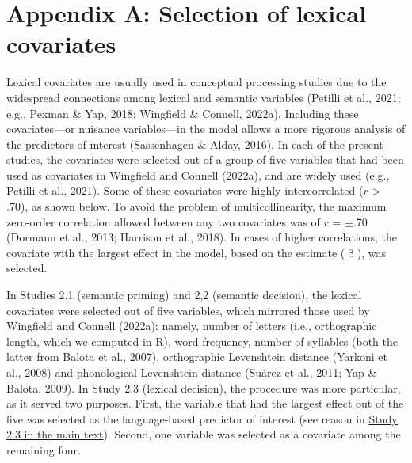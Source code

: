 \documentclass[
  12pt,
  man,floatsintext]{apa7}
\renewcommand\appendix{}
\begin{document}
\clearpage

\hypertarget{appendix-appendix}{%
\appendix}


\renewcommand{\thefigure}{A\arabic{figure}} \setcounter{figure}{0}
\renewcommand{\thetable}{A\arabic{table}} \setcounter{table}{0}

\hypertarget{appendix-A-lexical-covariates}{%
\section{Appendix A: Selection of lexical covariates}\label{appendix-A-lexical-covariates}}

Lexical covariates are usually used in conceptual processing studies due to the widespread connections among lexical and semantic variables (Petilli et al., 2021; e.g., Pexman \& Yap, 2018; Wingfield \& Connell, 2022a). Including these covariates---or nuisance variables---in the model allows a more rigorous analysis of the predictors of interest (Sassenhagen \& Alday, 2016). In each of the present studies, the covariates were selected out of a group of five variables that had been used as covariates in Wingfield and Connell (2022a), and are widely used (e.g., Petilli et al., 2021). Some of these covariates were highly intercorrelated (\(r\) \textgreater{} .70), as shown below. To avoid the problem of multicollinearity, the maximum zero-order correlation allowed between any two covariates was of \(r\) = \(\pm\).70 (Dormann et al., 2013; Harrison et al., 2018). In cases of higher correlations, the covariate with the largest effect in the model, based on the estimate (\(\upbeta\)), was selected.

In Studies 2.1 (semantic priming) and 2,2 (semantic decision), the lexical covariates were selected out of five variables, which mirrored those used by Wingfield and Connell (2022a): namely, number of letters (i.e., orthographic length, which we computed in R), word frequency, number of syllables (both the latter from Balota et al., 2007), orthographic Levenshtein distance (Yarkoni et al., 2008) and phonological Levenshtein distance (Suárez et al., 2011; Yap \& Balota, 2009). In Study 2.3 (lexical decision), the procedure was more particular, as it served two purposes. First, the variable that had the largest effect out of the five was selected as the language-based predictor of interest (see reason in \protect\hyperlink{lexicaldecision}{\underline{Study 2.3 in the main text}}). Second, one variable was selected as a covariate among the remaining four.
\end{document}
